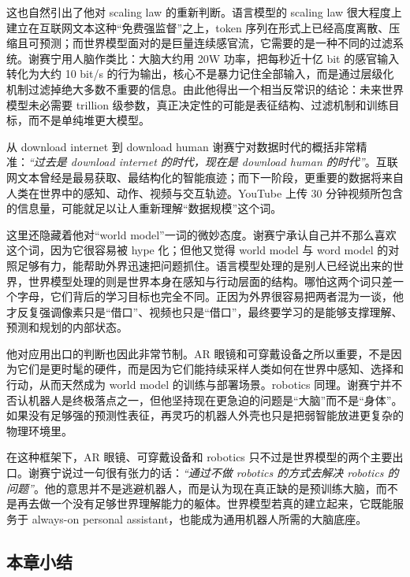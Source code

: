 \documentclass[a4paper,12pt]{article}
\begin{document}
这也自然引出了他对 scaling law 的重新判断。语言模型的 scaling law 很大程度上建立在互联网文本这种“免费强监督”之上，token 序列在形式上已经高度离散、压缩且可预测；而世界模型面对的是巨量连续感官流，它需要的是一种不同的过滤系统。谢赛宁用人脑作类比：大脑大约用 20W 功率，把每秒近十亿 bit 的感官输入转化为大约 10 bit/s 的行为输出，核心不是暴力记住全部输入，而是通过层级化机制过滤掉绝大多数不重要的信息。由此他得出一个相当反常识的结论：未来世界模型未必需要 trillion 级参数，真正决定性的可能是表征结构、过滤机制和训练目标，而不是单纯堆更大模型。

\begin{importantbox}{从 download internet 到 download human}
谢赛宁对数据时代的概括非常精准：\textit{``过去是 download internet 的时代，现在是 download human 的时代''}。互联网文本曾经是最易获取、最结构化的智能痕迹；而下一阶段，更重要的数据将来自人类在世界中的感知、动作、视频与交互轨迹。YouTube 上传 30 分钟视频所包含的信息量，可能就足以让人重新理解“数据规模”这个词。
\end{importantbox}

这里还隐藏着他对“world model”一词的微妙态度。谢赛宁承认自己并不那么喜欢这个词，因为它很容易被 hype 化；但他又觉得 world model 与 word model 的对照足够有力，能帮助外界迅速把问题抓住。语言模型处理的是别人已经说出来的世界，世界模型处理的则是世界本身在感知与行动层面的结构。哪怕这两个词只差一个字母，它们背后的学习目标也完全不同。正因为外界很容易把两者混为一谈，他才反复强调像素只是“借口”、视频也只是“借口”，最终要学习的是能够支撑理解、预测和规划的内部状态。

他对应用出口的判断也因此非常节制。AR 眼镜和可穿戴设备之所以重要，不是因为它们是更时髦的硬件，而是因为它们能持续采样人类如何在世界中感知、选择和行动，从而天然成为 world model 的训练与部署场景。robotics 同理。谢赛宁并不否认机器人是终极落点之一，但他坚持现在更急迫的问题是“大脑”而不是“身体”。如果没有足够强的预测性表征，再灵巧的机器人外壳也只是把弱智能放进更复杂的物理环境里。

在这种框架下，AR 眼镜、可穿戴设备和 robotics 只不过是世界模型的两个主要出口。谢赛宁说过一句很有张力的话：\textit{``通过不做 robotics 的方式去解决 robotics 的问题''}。他的意思并不是逃避机器人，而是认为现在真正缺的是预训练大脑，而不是再去做一个没有足够世界理解能力的躯体。世界模型若真的建立起来，它既能服务于 always-on personal assistant，也能成为通用机器人所需的大脑底座。

\subsection{本章小结}
\end{document}
